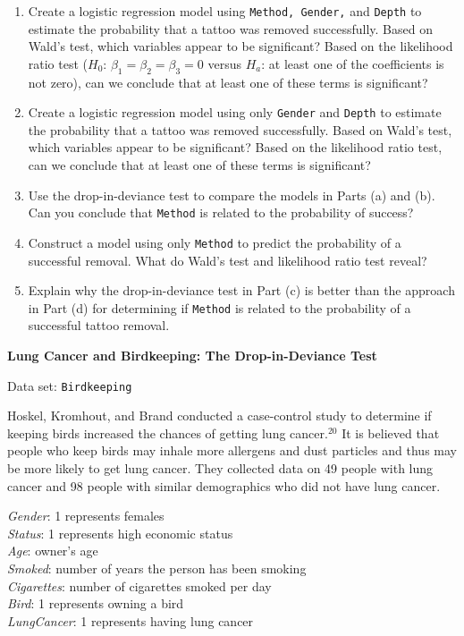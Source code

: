 \documentclass[
]{report}
\begin{document}
\begin{list}{E..}{ \setlength{\itemsep}{1.2em}}
  \begin{enumerate}
    \item Create a logistic regression model using \texttt{Method, Gender,} and \texttt{Depth} to estimate the probability that a tattoo was removed successfully. Based on Wald’s test, which variables appear to be significant? Based on the likelihood ratio test ($H_0$: $\beta_1 = \beta_2 = \beta_3 = 0$ versus $H_a$: at least one of the coefficients is not zero), can we conclude that at least one of these terms is significant?
    \item Create a logistic regression model using only \texttt{Gender} and \texttt{Depth} to estimate the probability that a tattoo was removed successfully. Based on Wald’s test, which variables appear to be significant? Based on the likelihood ratio test, can we conclude that at least one of these terms is significant?
    \item Use the drop-in-deviance test to compare the models in Parts (a) and (b). Can you conclude that \texttt{Method} is related to the probability of success?
    \item Construct a model using only \texttt{Method} to predict the probability of a successful removal. What do Wald’s test and likelihood ratio test reveal?
    \item Explain why the drop-in-deviance test in Part (c) is better than the approach in Part (d) for determining if \texttt{Method} is related to the probability of a successful tattoo removal.
  \end{enumerate}

  \item \textbf{Lung Cancer and Birdkeeping: The Drop-in-Deviance Test}

Data set: \texttt{Birdkeeping}

Hoskel, Kromhout, and Brand conducted a case-control study to determine if keeping birds increased the chances of getting lung cancer.$^{20}$ It is believed that people who keep birds may inhale more allergens and dust particles and thus may be more likely to get lung cancer. They collected data on 49 people with lung cancer and 98 people with similar demographics who did not have lung cancer.

\textit{Gender}: 1 represents females \\
\textit{Status}: 1 represents high economic status \\
\textit{Age}: owner’s age \\
\textit{Smoked}: number of years the person has been smoking \\
\textit{Cigarettes}: number of cigarettes smoked per day \\
\textit{Bird}: 1 represents owning a bird \\
\textit{LungCancer}: 1 represents having lung cancer


\end{list}
\end{document}
